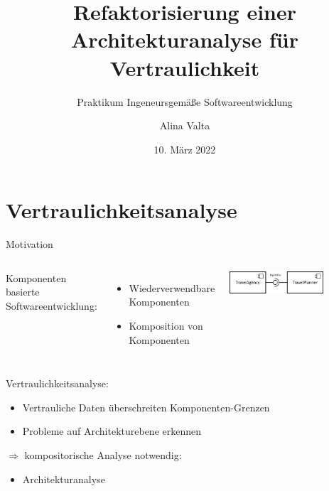 \documentclass{sdqbeamer}
\title[Refaktorisierung einer Architekturanalyse für Vertraulichkeit]{Refaktorisierung einer Architekturanalyse für Vertraulichkeit}
\subtitle{Praktikum Ingeneursgemäße Softwareentwicklung}
\author[Alina Valta]{Alina Valta}
\date[10.\,03.\,2022]{10. März 2022}
\begin{document}
\renewcommand{\figurename}{Abb}
\KITtitleframe


\section{Vertraulichkeitsanalyse}

\begin{frame}{Motivation}
	\begin{columns}
	Komponenten basierte Softwareentwicklung:
	\begin{itemize}
		\item Wiederverwendbare Komponenten
		\item Komposition von Komponenten
	\end{itemize}
	\includegraphics[width=0.7\textwidth]{images/CBSE_example.png}
	\end{columns}
\vspace{0.05\textheight}
	Vertraulichkeitsanalyse:
	\begin{itemize}
		\item Vertrauliche Daten überschreiten Komponenten-Grenzen
		\item Probleme auf Architekturebene erkennen
	\end{itemize}
\vspace{0.05\textheight}
$\Rightarrow$ kompositorische Analyse notwendig:
\begin{itemize}
	\item Architekturanalyse
\end{itemize}
\end{frame}
\end{document}
